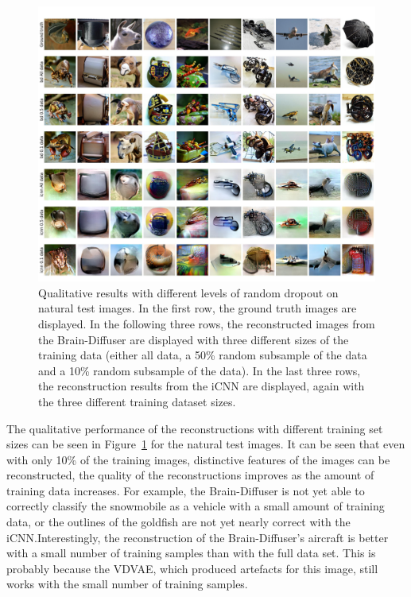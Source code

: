 \begin{figure}[]
  \centering
  \includegraphics[width=1\textwidth]{plots/dropout_qual_random_test.JPEG}
  \caption[Qualitative results random dropout on natural test images]{Qualitative results with different levels of random dropout on natural test images. In the first row, the ground truth images are displayed. In the following three rows, the reconstructed images from the Brain-Diffuser are displayed with three different sizes of the training data (either all data, a 50\% random subsample of the data and a 10\% random subsample of the data). In the last three rows, the reconstruction results from the iCNN are displayed, again with the three different training dataset sizes.}\label{fig:dropout_qual_random_test}
\end{figure}


The qualitative performance of the reconstructions with different training set sizes can be seen in Figure~\ref{fig:dropout_qual_random_test} for the natural test images. It can be seen that even with only 10\% of the training images, distinctive features of the images can be reconstructed,  the quality of the reconstructions improves as the amount of training data increases. For example, the Brain-Diffuser is not yet able to correctly classify the snowmobile as a vehicle with a small amount of training data, or the outlines of the goldfish are not yet nearly correct with the iCNN.\@ Interestingly, the reconstruction of the Brain-Diffuser's aircraft is better with a small number of training samples than with the full data set. This is probably because the VDVAE, which produced artefacts for this image, still works with the small number of training samples. 


